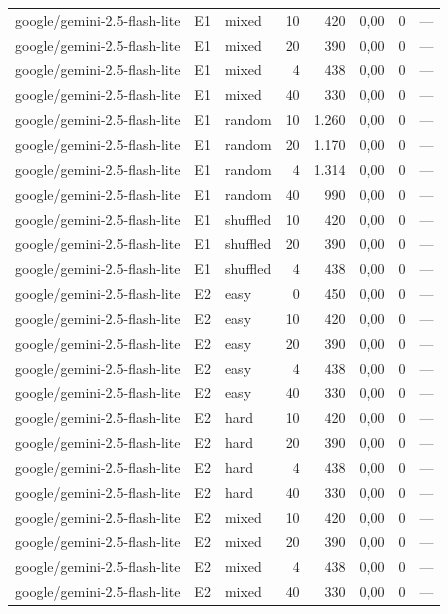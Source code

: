 \begin{table}[htbp]
\begin{tabular}{lllrrrrr}
google/gemini-2.5-flash-lite & E1 & mixed & 10 & 420 & 0,00 & 0 & — \\
google/gemini-2.5-flash-lite & E1 & mixed & 20 & 390 & 0,00 & 0 & — \\
google/gemini-2.5-flash-lite & E1 & mixed & 4 & 438 & 0,00 & 0 & — \\
google/gemini-2.5-flash-lite & E1 & mixed & 40 & 330 & 0,00 & 0 & — \\
google/gemini-2.5-flash-lite & E1 & random & 10 & 1.260 & 0,00 & 0 & — \\
google/gemini-2.5-flash-lite & E1 & random & 20 & 1.170 & 0,00 & 0 & — \\
google/gemini-2.5-flash-lite & E1 & random & 4 & 1.314 & 0,00 & 0 & — \\
google/gemini-2.5-flash-lite & E1 & random & 40 & 990 & 0,00 & 0 & — \\
google/gemini-2.5-flash-lite & E1 & shuffled & 10 & 420 & 0,00 & 0 & — \\
google/gemini-2.5-flash-lite & E1 & shuffled & 20 & 390 & 0,00 & 0 & — \\
google/gemini-2.5-flash-lite & E1 & shuffled & 4 & 438 & 0,00 & 0 & — \\
google/gemini-2.5-flash-lite & E2 & easy & 0 & 450 & 0,00 & 0 & — \\
google/gemini-2.5-flash-lite & E2 & easy & 10 & 420 & 0,00 & 0 & — \\
google/gemini-2.5-flash-lite & E2 & easy & 20 & 390 & 0,00 & 0 & — \\
google/gemini-2.5-flash-lite & E2 & easy & 4 & 438 & 0,00 & 0 & — \\
google/gemini-2.5-flash-lite & E2 & easy & 40 & 330 & 0,00 & 0 & — \\
google/gemini-2.5-flash-lite & E2 & hard & 10 & 420 & 0,00 & 0 & — \\
google/gemini-2.5-flash-lite & E2 & hard & 20 & 390 & 0,00 & 0 & — \\
google/gemini-2.5-flash-lite & E2 & hard & 4 & 438 & 0,00 & 0 & — \\
google/gemini-2.5-flash-lite & E2 & hard & 40 & 330 & 0,00 & 0 & — \\
google/gemini-2.5-flash-lite & E2 & mixed & 10 & 420 & 0,00 & 0 & — \\
google/gemini-2.5-flash-lite & E2 & mixed & 20 & 390 & 0,00 & 0 & — \\
google/gemini-2.5-flash-lite & E2 & mixed & 4 & 438 & 0,00 & 0 & — \\
google/gemini-2.5-flash-lite & E2 & mixed & 40 & 330 & 0,00 & 0 & — \\

\end{tabular}
\end{table}
